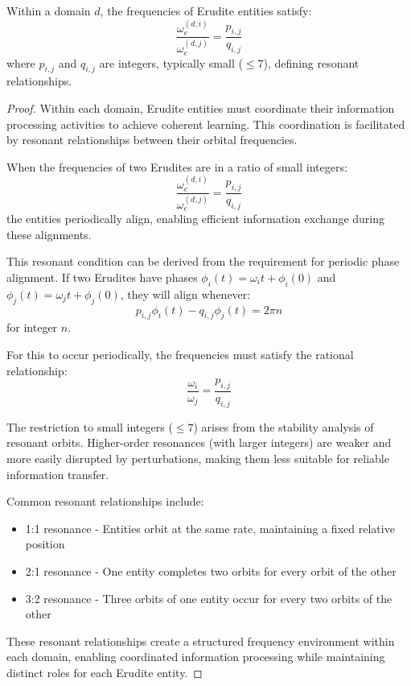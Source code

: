 \begin{theorem}
Within a domain $d$, the frequencies of Erudite entities satisfy:
\begin{equation}
\frac{\omega_e^{(d,i)}}{\omega_e^{(d,j)}} = \frac{p_{i,j}}{q_{i,j}}
\end{equation}
where $p_{i,j}$ and $q_{i,j}$ are integers, typically small ($\leq 7$), defining resonant relationships.
\end{theorem}

\begin{proof}
Within each domain, Erudite entities must coordinate their information processing activities to achieve coherent learning. This coordination is facilitated by resonant relationships between their orbital frequencies.

When the frequencies of two Erudites are in a ratio of small integers:
\begin{equation}
\frac{\omega_e^{(d,i)}}{\omega_e^{(d,j)}} = \frac{p_{i,j}}{q_{i,j}}
\end{equation}
the entities periodically align, enabling efficient information exchange during these alignments.

This resonant condition can be derived from the requirement for periodic phase alignment. If two Erudites have phases $\phi_i(t) = \omega_i t + \phi_i(0)$ and $\phi_j(t) = \omega_j t + \phi_j(0)$, they will align whenever:
\begin{equation}
p_{i,j}\phi_i(t) - q_{i,j}\phi_j(t) = 2\pi n
\end{equation}
for integer $n$.

For this to occur periodically, the frequencies must satisfy the rational relationship:
\begin{equation}
\frac{\omega_i}{\omega_j} = \frac{p_{i,j}}{q_{i,j}}
\end{equation}

The restriction to small integers ($\leq 7$) arises from the stability analysis of resonant orbits. Higher-order resonances (with larger integers) are weaker and more easily disrupted by perturbations, making them less suitable for reliable information transfer.

Common resonant relationships include:
\begin{itemize}
    \item 1:1 resonance - Entities orbit at the same rate, maintaining a fixed relative position
    \item 2:1 resonance - One entity completes two orbits for every orbit of the other
    \item 3:2 resonance - Three orbits of one entity occur for every two orbits of the other
\end{itemize}

These resonant relationships create a structured frequency environment within each domain, enabling coordinated information processing while maintaining distinct roles for each Erudite entity.
\end{proof}

